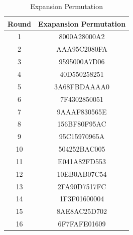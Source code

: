 \documentclass[12pt, letterpaper]{article}
\begin{document}
\begin{table}[h]
    \centering
    \begin{tabular}{|c|c|}
        
        \hline
        Round & Exapansion Permutation \\
        \hline
        1 & 8000A28000A2   \\
        \hline
        2 & AAA95C2080FA
        \\
        \hline
        3  & 9595000A7D06
        \\
         \hline
        4 & 40D550258251
        \\
         \hline
        5 & 3A68FBDAAAA0
        \\
         \hline
        6 & 7F4302850051
        \\
         \hline
        7 & 9AAAF830565E
        \\
         \hline
        8 & 156BF80F95AC
        \\
         \hline
        9 & 95C15970965A
        \\
         \hline
        10 & 504252BAC005
        \\
         \hline
        11 & E041A82FD553
        \\
         \hline
        12 & 10EB0AB07C54
        \\
         \hline
        13 & 2FA90D7517FC
        \\
         \hline
        14 & 1F3F01600004
        \\
         \hline
        15 & 8AE8AC25D702
        \\
         \hline
        16 & 6F7FAFE01609
        \\
        \hline
        
    \end{tabular}
    \caption{Expansion Permutation}
    \label{tab:lpt-rpt}
\end{table}
\end{document}
